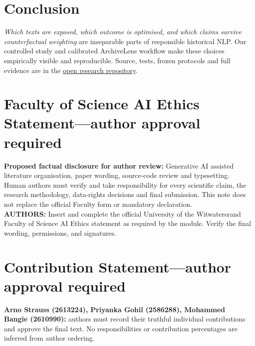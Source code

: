 \documentclass[10pt,letterpaper]{article}
\begin{document}
\section{Conclusion}
\emph{Which texts are exposed, which outcome is optimised, and which claims survive counterfactual weighting} are inseparable parts of responsible historical NLP. Our controlled study and calibrated ArchiveLens workflow make these choices empirically visible and reproducible. Source, tests, frozen protocols and full evidence are in the \href{https://github.com/Stralb/isixhosa-archive-nlp/blob/main/reports/PAPER_TO_EVIDENCE_GUIDE.md}{open research repository}.

\clearpage


\clearpage

\clearpage
\section*{Faculty of Science AI Ethics Statement---author approval required}
\noindent\textbf{Proposed factual disclosure for author review:} Generative AI assisted literature organisation, paper wording, source-code review and typesetting. Human authors must verify and take responsibility for every scientific claim, the research methodology, data-rights decisions and final submission. This note does not replace the official Faculty form or mandatory declaration.\\[5pt]
\noindent\textbf{AUTHORS:} Insert and complete the official University of the Witwatersrand Faculty of Science AI Ethics statement as required by the module. Verify the final wording, permissions, and signatures.

\section*{Contribution Statement---author approval required}
\noindent\textbf{Arno Strauss (2613224), Priyanka Gohil (2586288), Mohammed Bangie (2610990):} authors must record their truthful individual contributions and approve the final text. No responsibilities or contribution percentages are inferred from author ordering.
\end{document}
